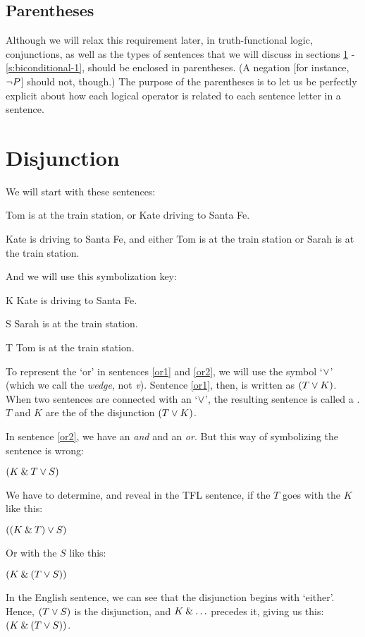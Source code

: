 \subsection{Parentheses}

Although we will relax this requirement later, in truth-functional logic, conjunctions, as well as the types of sentences that we will discuss in sections \ref{s:ConnectiveDisjunction} - \ref{s:biconditional-1}, should be enclosed in parentheses. (A negation [for instance, ${\neg} P$] should not, though.) The purpose of the parentheses is to let us be perfectly explicit about how each logical operator is related to each sentence letter in a sentence. 



\section{Disjunction}
\label{s:ConnectiveDisjunction}

We will start with these sentences:
	\begin{earg}
		\item[\ex{or1}] Tom is at the train station, or Kate driving to Santa Fe.
		\item[\ex{or2}] Kate is driving to Santa Fe, and either Tom is at the train station or Sarah is at the train station. 
	\end{earg}
And we will use this symbolization key:
	\begin{ekey}
		\item[K] Kate is driving to Santa Fe.
		\item[S] Sarah is at the train station.
		\item[T] Tom is at the train station.
	\end{ekey}
To represent the `or' in sentences \ref{or1} and \ref{or2}, we will use the symbol `$\vee$' (which we call the \textit{wedge}, not \textit{v}). Sentence \ref{or1}, then, is written as $(T \vee K)$. When two sentences are connected with an `$\vee$', the resulting sentence is called a . $T$ and $K$ are the  of the disjunction $(T \vee K)$.

In sentence \ref{or2}, we have an \textit{and} and an \textit{or}. But this way of symbolizing the sentence is wrong:
	\begin{earg}
		\item[] $(K \mathbin{\&} T \vee S)$ 
	\end{earg}
We have to determine, and reveal in the TFL sentence, if the $T$ goes with the $K$ like this:
	\begin{earg}
		\item[] $((K \mathbin{\&} T) \vee S)$ 
	\end{earg}
Or with the $S$ like this:
	\begin{earg}
		\item[] $(K \mathbin{\&} (T \vee S))$ 
	\end{earg}
In the English sentence, we can see that the disjunction begins with `either'. Hence, $(T \vee S)$ is the disjunction, and $K \mathbin{\&} \ldots$ precedes it, giving us this: $(K \mathbin{\&} (T \vee S))$.


